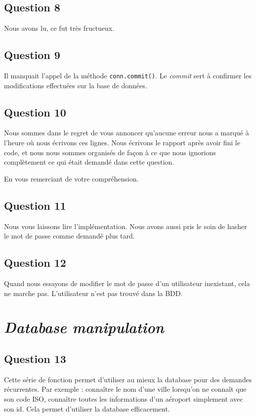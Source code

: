 \documentclass{ceri/sty/rapport}
\begin{document}
\subsection{Question 8}
Nous avons lu, ce fut très fructueux.

\subsection{Question 9}
Il manquait l'appel de la méthode \texttt{conn.commit()}.
Le \textit{commit} sert à confirmer les modifications effectuées sur la base de données.

\subsection{Question 10}
Nous sommes dans le regret de vous annoncer qu'aucune erreur nous a marqué à l'heure où nous écrivons ces lignes.
Nous écrivons le rapport après avoir fini le code, et nous nous sommes organisés de façon à ce que nous ignorions complètement ce qui était demandé dans cette question.

En vous remerciant de votre compréhension.

\subsection{Question 11}
Nous vous laissons lire l'implémentation.
Nous avons aussi pris le soin de hasher le mot de passe comme demandé plus tard.

\subsection{Question 12}
Quand nous essayons de modifier le mot de passe d'un utilisateur inexistant, cela ne marche pas.
L'utilisateur n'est pas trouvé dans la BDD.



\section{\textit{Database manipulation}}
\subsection{Question 13}
Cette série de fonction permet d'utiliser au mieux la database pour des demandes récurrentes.
Par exemple : connaître le nom d'une ville lorsqu'on ne connaît que son code ISO, connaître toutes les informations d'un aéroport simplement avec son id.
Cela permet d'utiliser la database efficacement.
\end{document}
